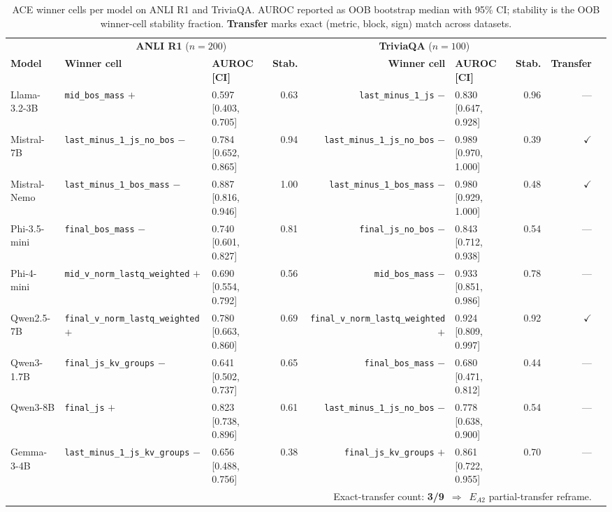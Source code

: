 \begin{table}[t]
\centering
\caption{ACE winner cells per model on ANLI R1 and TriviaQA. AUROC reported as OOB bootstrap median with 95\% CI; stability is the OOB winner-cell stability fraction. \textbf{Transfer} marks exact (metric, block, sign) match across datasets.}
\label{tab:ace_winner_cells}
\small
\setlength{\tabcolsep}{4pt}
\begin{tabular}{@{}lllrrlrrc@{}}
\toprule
 & \multicolumn{3}{c}{\textbf{ANLI R1} ($n{=}200$)} & \multicolumn{3}{c}{\textbf{TriviaQA} ($n{=}100$)} & \\
\cmidrule(lr){2-4} \cmidrule(lr){5-7}
\textbf{Model} & \textbf{Winner cell} & \textbf{AUROC [CI]} & \textbf{Stab.} & \textbf{Winner cell} & \textbf{AUROC [CI]} & \textbf{Stab.} & \textbf{Transfer} \\
\midrule
Llama-3.2-3B & \texttt{mid\_bos\_mass} $+$ & 0.597 [0.403, 0.705] & 0.63 & \texttt{last\_minus\_1\_js} $-$ & 0.830 [0.647, 0.928] & 0.96 & --- \\
Mistral-7B & \texttt{last\_minus\_1\_js\_no\_bos} $-$ & 0.784 [0.652, 0.865] & 0.94 & \texttt{last\_minus\_1\_js\_no\_bos} $-$ & 0.989 [0.970, 1.000] & 0.39 & $\checkmark$ \\
Mistral-Nemo & \texttt{last\_minus\_1\_bos\_mass} $-$ & 0.887 [0.816, 0.946] & 1.00 & \texttt{last\_minus\_1\_bos\_mass} $-$ & 0.980 [0.929, 1.000] & 0.48 & $\checkmark$ \\
Phi-3.5-mini & \texttt{final\_bos\_mass} $-$ & 0.740 [0.601, 0.827] & 0.81 & \texttt{final\_js\_no\_bos} $-$ & 0.843 [0.712, 0.938] & 0.54 & --- \\
Phi-4-mini & \texttt{mid\_v\_norm\_lastq\_weighted} $+$ & 0.690 [0.554, 0.792] & 0.56 & \texttt{mid\_bos\_mass} $-$ & 0.933 [0.851, 0.986] & 0.78 & --- \\
Qwen2.5-7B & \texttt{final\_v\_norm\_lastq\_weighted} $+$ & 0.780 [0.663, 0.860] & 0.69 & \texttt{final\_v\_norm\_lastq\_weighted} $+$ & 0.924 [0.809, 0.997] & 0.92 & $\checkmark$ \\
Qwen3-1.7B & \texttt{final\_js\_kv\_groups} $-$ & 0.641 [0.502, 0.737] & 0.65 & \texttt{final\_bos\_mass} $-$ & 0.680 [0.471, 0.812] & 0.44 & --- \\
Qwen3-8B & \texttt{final\_js} $+$ & 0.823 [0.738, 0.896] & 0.61 & \texttt{last\_minus\_1\_js\_no\_bos} $-$ & 0.778 [0.638, 0.900] & 0.54 & --- \\
Gemma-3-4B & \texttt{last\_minus\_1\_js\_kv\_groups} $-$ & 0.656 [0.488, 0.756] & 0.38 & \texttt{final\_js\_kv\_groups} $+$ & 0.861 [0.722, 0.955] & 0.70 & --- \\
\midrule
\multicolumn{8}{r}{Exact-transfer count: \textbf{3/9} $\,\Rightarrow\,$ $E_{A2}$ partial-transfer reframe.} \\
\bottomrule
\end{tabular}
\end{table}
